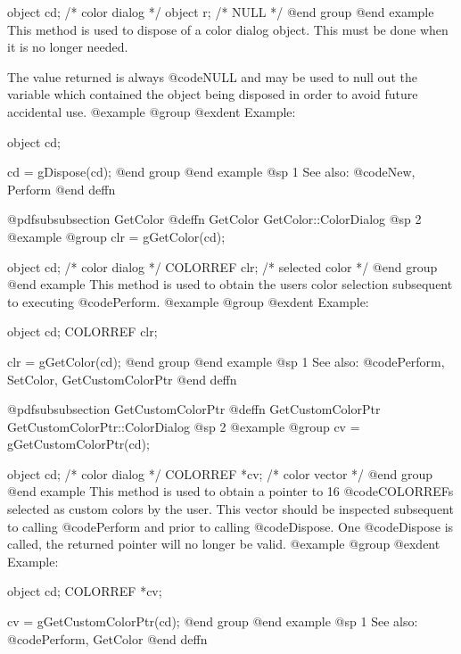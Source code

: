 object  cd;     /*  color dialog   */
object  r;      /*  NULL           */
@end group
@end example
This method is used to dispose of a color dialog object.  This must
be done when it is no longer needed.

The value returned is always @code{NULL} and may be used to null out
the variable which contained the object being disposed in order to
avoid future accidental use.
@example
@group
@exdent Example:

object  cd;

cd = gDispose(cd);
@end group
@end example
@sp 1
See also:  @code{New, Perform}
@end deffn









@pdfsubsubsection {GetColor}
@deffn {GetColor} GetColor::ColorDialog
@sp 2
@example
@group
clr = gGetColor(cd);

object   cd;    /*  color dialog    */
COLORREF clr;   /*  selected color  */
@end group
@end example
This method is used to obtain the users color selection subsequent to
executing @code{Perform}.
@example
@group
@exdent Example:

object  cd;
COLORREF clr;

clr = gGetColor(cd);
@end group
@end example
@sp 1
See also:  @code{Perform, SetColor, GetCustomColorPtr}
@end deffn













@pdfsubsubsection {GetCustomColorPtr}
@deffn {GetCustomColorPtr} GetCustomColorPtr::ColorDialog
@sp 2
@example
@group
cv = gGetCustomColorPtr(cd);

object   cd;    /*  color dialog    */
COLORREF *cv;   /*  color vector    */
@end group
@end example
This method is used to obtain a pointer to 16 @code{COLORREF}s
selected as custom colors by the user.  This vector should be
inspected subsequent to calling @code{Perform} and prior to
calling @code{Dispose}.  One @code{Dispose} is called, the returned
pointer will no longer be valid.
@example
@group
@exdent Example:

object  cd;
COLORREF *cv;

cv = gGetCustomColorPtr(cd);
@end group
@end example
@sp 1
See also:  @code{Perform, GetColor}
@end deffn




















